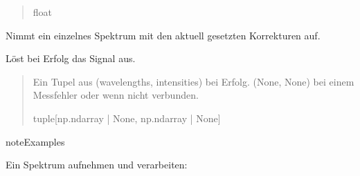 \documentclass[letterpaper,10pt,english]{sphinxmanual}
\begin{document}
\begin{fulllineitems}
\begin{fulllineitems}
\begin{quote}
\begin{description}
\begin{description}
\end{description}


\sphinxAtStartPar
float

\end{description}\end{quote}

\end{fulllineitems}


\begin{fulllineitems}
\label{\detokenize{modulab/spectrometer_manager:modules.spectrometer.SpectrometerManager.SpectrometerManager.acquire_spectrum}}
\pysigstartsignatures
\pysiglinewithargsret
{}
{}
{}
\pysigstopsignatures
\sphinxAtStartPar
Nimmt ein einzelnes Spektrum mit den aktuell gesetzten Korrekturen auf.

\sphinxAtStartPar
Löst bei Erfolg das \sphinxhyphen{}Signal aus.
\begin{quote}\begin{description}
\sphinxAtStartPar
Ein Tupel aus (wavelengths, intensities) bei Erfolg.
(None, None) bei einem Messfehler oder wenn nicht verbunden.

\sphinxAtStartPar
tuple{[}np.ndarray | None, np.ndarray | None{]}

\end{description}\end{quote}

\begin{sphinxadmonition}{note}{Examples}

\sphinxAtStartPar
Ein Spektrum aufnehmen und verarbeiten:

\begin{sphinxVerbatim}[commandchars=\\\{\}]

   

    
      
      \PYG{p}{[}\PYG{p}{]}
      \PYG{p}{[}\PYG{p}{]}


\end{sphinxVerbatim}
\end{sphinxadmonition}
\end{fulllineitems}
\end{fulllineitems}
\end{document}
